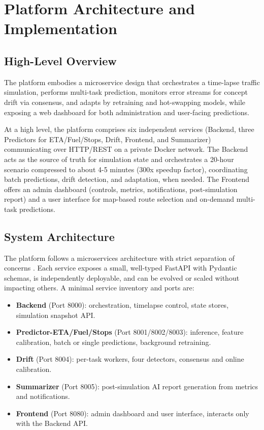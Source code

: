 \chapter{Platform Architecture and Implementation}
\label{ch:platform_architecture_implementation}

\section{High-Level Overview}
The platform embodies a microservice design that orchestrates a time-lapse traffic simulation, performs multi-task prediction, monitors error streams for concept drift via consensus, and adapts by retraining and hot-swapping models, while exposing a web dashboard for both administration and user-facing predictions.

At a high level, the platform comprises six independent services (Backend, three Predictors for ETA/Fuel/Stops, Drift, Frontend, and Summarizer) communicating over HTTP/REST on a private Docker network.
The Backend acts as the source of truth for simulation state and orchestrates a 20-hour scenario compressed to about 4-5 minutes (300x speedup factor), coordinating batch predictions, drift detection, and adaptation, when needed.
The Frontend offers an admin dashboard (controls, metrics, notifications, post-simulation report) and a user interface for map-based route selection and on-demand multi-task predictions.

\section{System Architecture}
The platform follows a microservices architecture with strict separation of concerns \cite{newman2015building}. Each service exposes a small, well-typed FastAPI with Pydantic schemas, is independently deployable, and can be evolved or scaled without impacting others. A minimal service inventory and ports are:

\begin{itemize}
    \item \textbf{Backend} (Port 8000): orchestration, timelapse control, state stores, simulation snapshot API.
    \item \textbf{Predictor-ETA/Fuel/Stops} (Port 8001/8002/8003): inference, feature calibration, batch or single predictions, background retraining.
    \item \textbf{Drift} (Port 8004): per-task workers, four detectors, consensus and online calibration.
    \item \textbf{Summarizer} (Port 8005): post-simulation AI report generation from metrics and notifications.
    \item \textbf{Frontend} (Port 8080): admin dashboard and user interface, interacts only with the Backend API.
\end{itemize}

